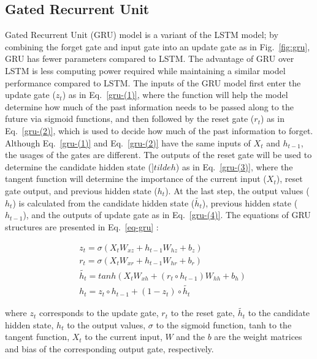 \subsection{Gated Recurrent Unit}
Gated Recurrent Unit (GRU) model is a variant of the LSTM model; by combining the forget gate and input gate into an update gate as in Fig.~\ref{fig:gru}, GRU has fewer parameters compared to LSTM. The advantage of GRU over LSTM is less computing power required while maintaining a similar model performance compared to LSTM. The inputs of the GRU model first enter the update gate ($z_t$) as in Eq.~\ref{gru-(1)}, where the function will help the model determine how much of the past information needs to be passed along to the future via sigmoid functions, and then followed by the reset gate ($r_t$) as in Eq.~\ref{gru-(2)}, which is used to decide how much of the past information to forget. Although Eq.~\ref{gru-(1)} and Eq.~\ref{gru-(2)} have the same inputs of $X_t$ and $h_{t-1}$, the usages of the gates are different. The outputs of the reset gate will be used to determine the candidate hidden state ($]tilde{h}$) as in Eq.~\ref{gru-(3)}, where the tangent function will determine the importance of the current input ($X_t$), reset gate output, and previous hidden state ($h_t$). At the last step, the output values ($h_t$) is calculated from the candidate hidden state ($\tilde{h_t}$), previous hidden state ($h_{t-1}$), and the outputs of update gate as in Eq.~\ref{gru-(4)}. The equations of GRU structures are presented in Eq.~\ref{eq-gru} \citep{chengForecastingWastewaterTreatment2020}:

\begin{subequations} \label{eq-gru}
  \begin{align}
      &z_t=\sigma(X_tW_{xz}+h_{t-1}W_{hz}+b_z) \label{gru-(1)}\\
      &r_t=\sigma(X_tW_{xr}+h_{t-1}W_{hr}+b_r) \label{gru-(2)}\\
      &\tilde{h_t}=tanh(X_tW_{xh}+(r_t\circ h_{t-1})W_{hh}+b_h) \label{gru-(3)}\\
      &h_t=z_t\circ h_{t-1}+(1-z_t)\circ \tilde{h_t} \label{gru-(4)}
  \end{align}
\end{subequations}

\noindent
where $z_t$ corresponds to the update gate, $r_t$ to the reset gate, $\tilde{h_t}$ to the candidate hidden state, $h_t$ to the output values, $\sigma$ to the sigmoid function, tanh to the tangent function, $X_t$ to the current input, $W$ and the $b$ are the weight matrices and bias of the corresponding output gate, respectively.

